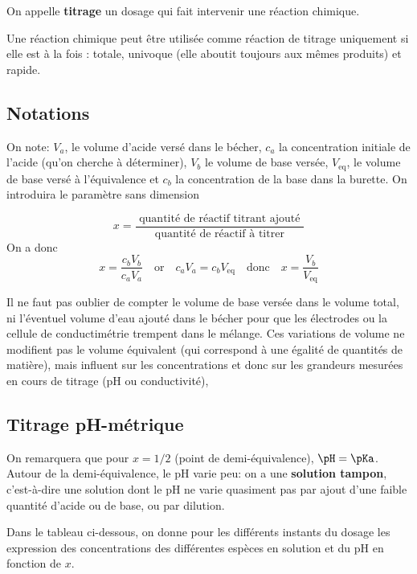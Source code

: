 \documentclass{tp}
\begin{document}
On appelle \textbf{titrage} un dosage qui fait intervenir une réaction chimique.

Une réaction chimique peut être utilisée comme réaction de titrage uniquement si elle est à la fois : totale, univoque (elle aboutit toujours aux mêmes produits) et rapide.

\subsection{Notations}%
\label{sub:notations}

On note: $V_a$, le volume d'acide versé dans le bécher, $c_a$ la concentration initiale de l'acide (qu'on cherche à déterminer), $V_b$ le volume de base versée, $V_\text{eq}$, le volume de base versé à l'équivalence et $c_b$ la concentration de la base dans la burette.
On introduira le paramètre sans dimension

\begin{equation}
  x=\frac{\text { quantité de réactif titrant ajouté }}{\text { quantité de réactif à titrer }}
\end{equation}
%
On a donc
\begin{equation}
  x = \frac{c_bV_b}{c_aV_a} \quad \text{or} \quad c_aV_a=c_bV_\text{eq} \quad \text{donc} \quad x=\frac{V_b}{V_\text{eq}}
\end{equation}

Il ne faut pas oublier de compter le volume de base versée dans le volume total, ni l'éventuel volume d'eau ajouté dans le bécher pour que les électrodes ou la cellule de conductimétrie trempent dans le mélange. Ces variations de volume ne modifient pas le volume équivalent (qui correspond à une égalité de quantités de matière), mais influent sur les concentrations et donc sur les grandeurs mesurées en cours de titrage (pH ou conductivité),

\subsection{Titrage pH-métrique}%
\label{sub:titrage_ph_metrique}

On remarquera que pour $x=1/2$ (point de demi-équivalence), $\pH=\pKa$. Autour de la demi-équivalence, le $\mathrm{pH}$ varie peu: on a une \textbf{solution tampon}, c'est-à-dire une solution dont le pH ne varie quasiment pas par ajout d'une faible quantité d'acide ou de base, ou par dilution.

Dans le tableau ci-dessous, on donne pour les différents instants du dosage les expression des concentrations des différentes espèces en solution et du pH en fonction de $x$. 
\end{document}
